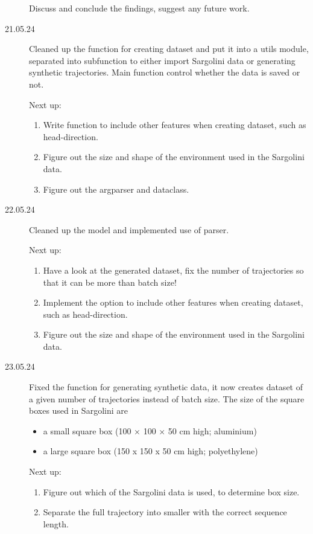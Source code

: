 \begin{description}
    Discuss and conclude the findings, suggest any future work.

    \item[21.05.24] Cleaned up the function for creating dataset and put it into a utils module, separated into subfunction to either import Sargolini data or generating synthetic trajectories. Main function control whether the data is saved or not. 

    Next up:
    \begin{enumerate}
        \item Write function to include other features when creating dataset, such as head-direction.
        \item Figure out the size and shape of the environment used in the Sargolini data.
        \item Figure out the argparser and dataclass.
    \end{enumerate}

    \item[22.05.24] Cleaned up the model and implemented use of parser.

    Next up:
    \begin{enumerate}
        \item Have a look at the generated dataset, fix the number of trajectories so that it can be more than batch size!
        \item Implement the option to include other features when creating dataset, such as head-direction.
        \item Figure out the size and shape of the environment used in the Sargolini data.
    \end{enumerate}

    \item[23.05.24] Fixed the function for generating synthetic data, it now creates dataset of a given number of trajectories instead of batch size. The size of the square boxes used in Sargolini are 
    \begin{itemize}
        \item a small square box (100 × 100 × 50 cm high; aluminium)
        \item a large square box (150 x 150 x 50 cm high; polyethylene)
    \end{itemize} 

    Next up:
    \begin{enumerate}
        \item Figure out which of the Sargolini data is used, to determine box size.
        \item Separate the full trajectory into smaller with the correct sequence length.
    \end{enumerate}


\end{description}
